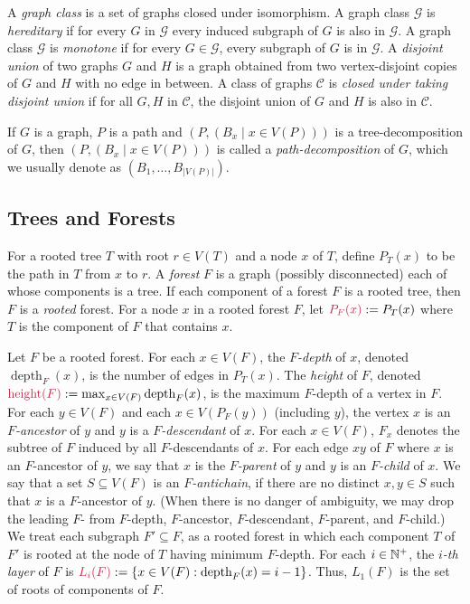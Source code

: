 \documentclass{patmorin}
\makeatletter
\newcommand{\defin}[1]{\emph{\textcolor{brightmaroon}{#1}}}
\def\mathcolor#1#{\@mathcolor{#1}}
\def\@mathcolor#1#2#3{%
  \protect\leavevmode
  \begingroup
    \color#1{#2}#3%
  \endgroup
}
\newcommand{\mathdefin}[1]{\mathcolor{brightmaroon}{#1}}
\DeclareMathOperator{\height}{height}
\DeclareMathOperator{\depth}{depth}
\newcommand{\calC}{\mathcal{C}}
\newcommand{\calG}{\mathcal{G}}
\makeatother
\begin{document}
A \defin{graph class} is a set of graphs closed under isomorphism. A graph class  $\calG$ is \defin{hereditary} if for every $G$ in $\calG$ every induced subgraph of $G$ is also in $\calG$. A  graph class $\calG$ is \defin{monotone} if for every $G\in\calG$, every subgraph of $G$ is in $\calG$. 
 A \defin{disjoint union} of two graphs $G$ and $H$ is a graph obtained from two vertex-disjoint copies of $G$ and $H$ with no edge in between. A class of graphs $\calC$ is \defin{closed under taking disjoint union} if for all $G,H$ in $\calC$, the disjoint union of $G$ and $H$ is also in $\calC$.

If $G$ is a graph, $P$ is a path and $(P,(B_x\mid x \in V(P)))$ is a tree-decomposition of $G$, then $(P,(B_x\mid x \in V(P)))$ is called a \defin{path-decomposition} of $G$, which we usually denote as $(B_1,\ldots,B_{|V(P)|})$.

\subsection{Trees and Forests}

For a rooted tree $T$ with root $r\in V(T)$ and a node $x$ of $T$, define \defin{$P_T(x)$} to be the path in $T$ from $x$ to $r$.    A \defin{forest} $F$ is a graph (possibly disconnected) each of whose components is a tree.  If each component of a forest $F$ is a rooted tree, then $F$ is a \defin{rooted} forest. For a node $x$ in a rooted forest $F$, let $\mathdefin{P_F(x)}:=P_T(x)$ where $T$ is the component of $F$ that contains $x$.

Let $F$ be a rooted forest.  For each $x\in V(F)$, the \defin{$F$-depth} of $x$, denoted \defin{$\depth_F(x)$}, is the number of edges in $P_T(x)$. The \defin{height} of $F$, denoted $\mathdefin{\height(F)}:=\max_{x\in V(F)}\depth_F(x)$, is the maximum $F$-depth of a vertex in $F$. For each $y\in V(F)$ and each $x\in V(P_F(y))$ (including $y$),  the vertex $x$ is an \defin{$F$-ancestor} of $y$ and $y$ is a \defin{$F$-descendant} of $x$.  For each $x\in V(F)$, \defin{$F_x$} denotes the subtree of $F$ induced by all $F$-descendants of $x$. For each edge $xy$ of $F$ where $x$ is an $F$-ancestor of $y$, we say that $x$ is the \defin{$F$-parent} of $y$ and $y$ is an \defin{$F$-child} of $x$. We say that a set $S\subseteq V(F)$ is an \defin{$F$-antichain}, if there are no distinct $x,y\in S$ such that $x$ is a $F$-ancestor of $y$.  (When there is no danger of ambiguity, we may drop the leading $F$- from $F$-depth, $F$-ancestor, $F$-descendant, $F$-parent, and $F$-child.) We treat each subgraph $F'\subseteq F$, as a rooted forest in which each component $T$ of $F'$ is rooted at the node of $T$ having minimum $F$-depth.  For each $i\in\mathbb{N}^+$, the \defin{$i$-th layer} of $F$ is $\mathdefin{L_i(F)}:=\{x\in V(F):\depth_F(x)=i-1\}$. Thus, $L_1(F)$ is the set of roots of components of $F$.
\end{document}
